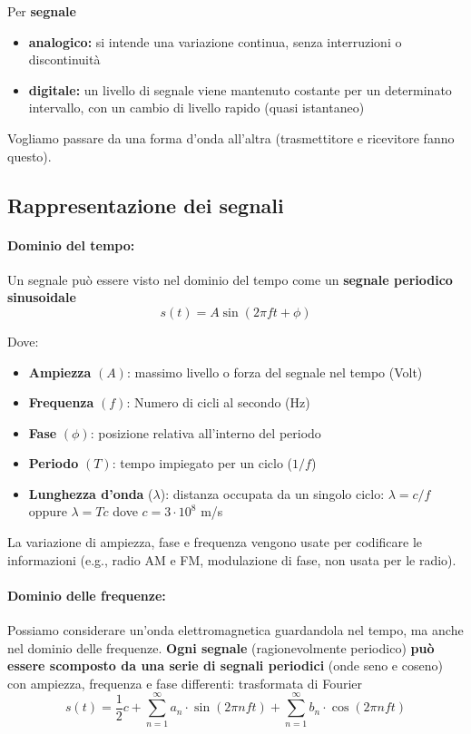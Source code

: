 Per \textbf{segnale}
\begin{itemize}
	\item \textbf{analogico:} si intende una variazione continua, senza interruzioni o discontinuità
    
	\item \textbf{digitale:} un livello di segnale viene mantenuto costante per un determinato intervallo, con un cambio di livello rapido (quasi istantaneo)
\end{itemize}

Vogliamo passare da una forma d'onda all'altra (trasmettitore e ricevitore fanno questo). 

\subsection{Rappresentazione dei segnali}

\paragraph{Dominio del tempo:} Un segnale può essere visto nel dominio del tempo come un \textbf{segnale periodico sinusoidale}
$$ s(t) = A \sin (2 \pi ft + \phi) $$

Dove: 
\begin{itemize}
	\item \textbf{Ampiezza} $(A)$:	massimo livello o forza del segnale nel tempo (Volt)
	
    \item \textbf{Frequenza} $(f)$: Numero di cicli al secondo (Hz)
	
    \item \textbf{Fase} $(\phi)$: posizione relativa all'interno del periodo
	
    \item \textbf{Periodo} $(T)$: tempo impiegato per un ciclo ($1/f$)
	
    \item \textbf{Lunghezza d'onda} ($\lambda$): distanza occupata da un singolo ciclo: $\lambda = c/f$ oppure $\lambda = T c$ dove $c = 3\cdot 10^8$ m/s
\end{itemize}

La variazione di ampiezza, fase e frequenza vengono usate per codificare le informazioni (e.g., radio AM e FM, modulazione di fase, non usata per le radio).

\paragraph{Dominio delle frequenze:} Possiamo considerare un'onda elettromagnetica guardandola nel tempo, ma anche nel dominio delle frequenze. \textbf{Ogni segnale} (ragionevolmente periodico) \textbf{può essere scomposto da una serie di segnali periodici} (onde seno e coseno) con ampiezza, frequenza e fase differenti: trasformata di Fourier
$$ s(t) = \frac{1}{2} c + \sum_{n=1}^{\infty} a_n \cdot \sin (2 \pi n f t) + \sum_{n=1}^{\infty} b_n \cdot \cos (2 \pi n f t) $$

